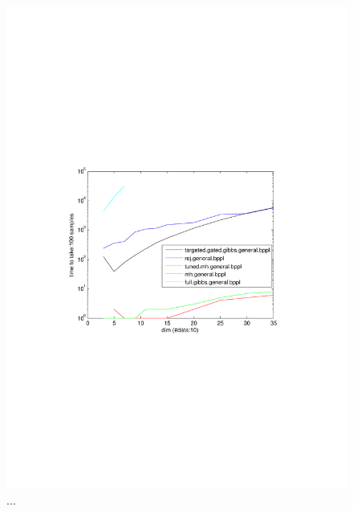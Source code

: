 \begin{figure}%
\centering
\includegraphics[width=1.2\textwidth]{pic1/dimAyalysisDataFixed10.pdf}
\caption{...}
\label{fig:pref}
\end{figure}


